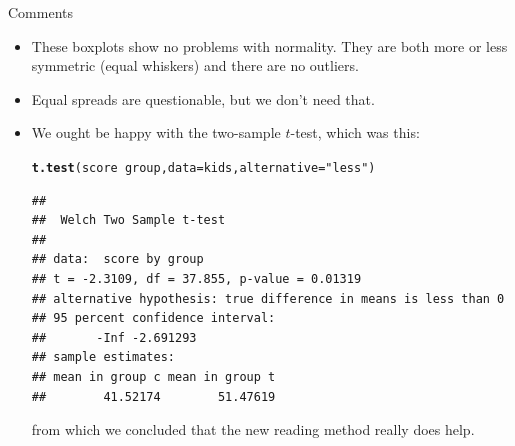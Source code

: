 \documentclass[unknownkeysallowed]{beamer}\usepackage[]{graphicx}\usepackage[]{color}
\makeatletter
\newcommand{\hlstr}[1]{\textcolor[rgb]{0.192,0.494,0.8}{#1}}%
\newcommand{\hlopt}[1]{\textcolor[rgb]{0,0,0}{#1}}%
\newcommand{\hlstd}[1]{\textcolor[rgb]{0.345,0.345,0.345}{#1}}%
\newcommand{\hlkwc}[1]{\textcolor[rgb]{0.333,0.667,0.333}{#1}}%
\newcommand{\hlkwd}[1]{\textcolor[rgb]{0.737,0.353,0.396}{\textbf{#1}}}%
\newenvironment{kframe}{%
 \def\at@end@of@kframe{}%
 \ifinner\ifhmode%
  \def\at@end@of@kframe{\end{minipage}}%
  \begin{minipage}{\columnwidth}%
 \fi\fi%
 \def\FrameCommand##1{\hskip\@totalleftmargin \hskip-\fboxsep
 \colorbox{shadecolor}{##1}\hskip-\fboxsep
     \hskip-\linewidth \hskip-\@totalleftmargin \hskip\columnwidth}%
 \MakeFramed {\advance\hsize-\width
   \@totalleftmargin\z@ \linewidth\hsize
   \@setminipage}}%
 {\par\unskip\endMakeFramed%
 \at@end@of@kframe}
\newenvironment{knitrout}{}{} %
\makeatother
\begin{document}
\begin{frame}[fragile]{Comments}
  
  \begin{itemize}
  \item These boxplots show no problems with normality. They are both
    more or less symmetric (equal whiskers) and there are no outliers.
  \item Equal spreads are questionable, but we don't need that.
  \item We ought be happy with the two-sample $t$-test, which was this:
    
\begin{knitrout}\footnotesize
{}\color{fgcolor}\begin{kframe}
\begin{alltt}
\hlkwd{t.test}\hlstd{(score}\hlopt{~}\hlstd{group,}\hlkwc{data}\hlstd{=kids,}\hlkwc{alternative}\hlstd{=}\hlstr{"less"}\hlstd{)}
\end{alltt}
\begin{verbatim}
## 
## 	Welch Two Sample t-test
## 
## data:  score by group
## t = -2.3109, df = 37.855, p-value = 0.01319
## alternative hypothesis: true difference in means is less than 0
## 95 percent confidence interval:
##       -Inf -2.691293
## sample estimates:
## mean in group c mean in group t 
##        41.52174        51.47619
\end{verbatim}
\end{kframe}
\end{knitrout}
from which we concluded that the new reading method really does help.
  \end{itemize}
  
\end{frame}
\end{document}
